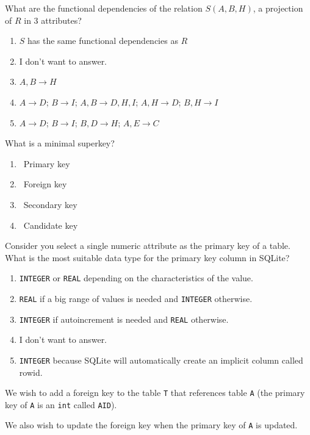 \documentclass{bdad}
\begin{document}
What are the functional dependencies of the relation $S (A, B, H)$, a projection of $R$ in 3 attributes?

\begin{enumerate}
    \item $S$ has the same functional dependencies as $R$
    \item I don't want to answer.
    \item $A, B \rightarrow H$
    \item $A\rightarrow D$; $B\rightarrow I$; $A, B \rightarrow  D, H, I$; $A, H\rightarrow D$; $B, H\rightarrow I$
    \item $A\rightarrow D$; $B\rightarrow I$; $B, D\rightarrow  H$; $A, E\rightarrow C$
\end{enumerate}

What is a minimal superkey?

\begin{enumerate}
    \item \checkbox~Primary key
    \item \checkbox~Foreign key
    \item \checkbox~Secondary key
    \item \checkbox~Candidate key
\end{enumerate}

Consider you select a single numeric attribute as the primary key of a table. What is the most suitable data type for the primary key column in SQLite?

\begin{enumerate}
    \item \texttt{INTEGER} or \texttt{REAL} depending on the characteristics of the value.
    \item \texttt{REAL} if a big range of values is needed and \texttt{INTEGER} otherwise.
    \item \texttt{INTEGER} if autoincrement is needed and \texttt{REAL} otherwise.
    \item I don't want to answer.
    \item \texttt{INTEGER} because SQLite will automatically create an implicit column called rowid.
\end{enumerate}

\newpage
{}
We wish to add a foreign key to the table \texttt{T} that references table \texttt{A} (the primary key of \texttt{A} is an \texttt{int} called \texttt{AID}).

We also wish to update the foreign key when the primary key of \texttt{A} is updated.
\end{document}
